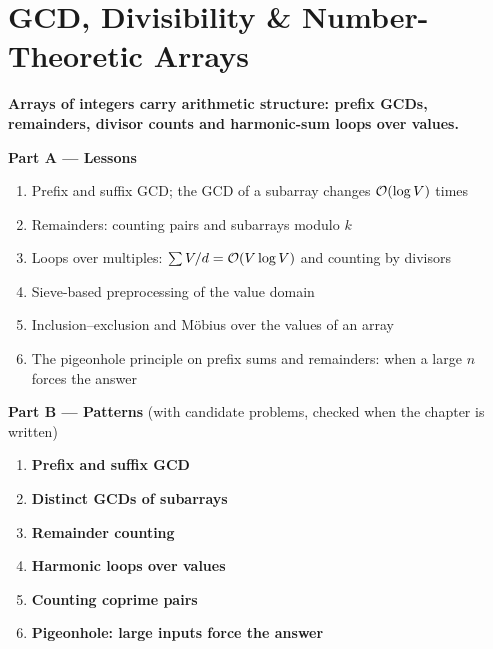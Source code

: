 \chapter{GCD, Divisibility \& Number-Theoretic Arrays}
\label{ch:number_arrays}

\begin{tcolorbox}[enhanced, colback=white, colframe=secondaryblue, boxrule=1pt, arc=2mm]
\textbf{\large\textcolor{primaryblue}{Arrays of integers carry arithmetic structure: prefix GCDs, remainders, divisor counts and harmonic-sum loops over values.}}
\end{tcolorbox}


\begin{plannedbox}
\textbf{Part A --- Lessons}
\begin{enumerate}[leftmargin=*, label=\textbf{A\arabic*.}, itemsep=1pt]
    \item Prefix and suffix GCD; the GCD of a subarray changes $\mathcal{O}(\log V)$ times
    \item Remainders: counting pairs and subarrays modulo $k$
    \item Loops over multiples: $\sum V/d = \mathcal{O}(V \log V)$ and counting by divisors
    \item Sieve-based preprocessing of the value domain
    \item Inclusion--exclusion and M\"obius over the values of an array
    \item The pigeonhole principle on prefix sums and remainders: when a large $n$ forces the answer
\end{enumerate}
\textbf{Part B --- Patterns} (with candidate problems, checked when the chapter is written)
\begin{enumerate}[leftmargin=*, label=\textbf{P\arabic*.}, itemsep=1pt]
    \item \textbf{Prefix and suffix GCD}
    \item \textbf{Distinct GCDs of subarrays}
    \item \textbf{Remainder counting}
    \item \textbf{Harmonic loops over values}
    \item \textbf{Counting coprime pairs}
    \item \textbf{Pigeonhole: large inputs force the answer}
\end{enumerate}
\end{plannedbox}
